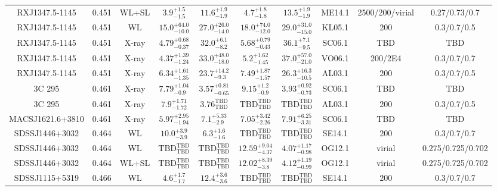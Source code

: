\begin{table}
\begin{tabular}{cccccccccc}
RXJ1347.5-1145 & 0.451 & WL+SL & ${3.9}^{+1.5}_{-1.5}$ & ${11.6}^{+1.9}_{-1.9}$ & ${4.7}^{+1.8}_{-1.8}$ & ${13.5}^{+1.9}_{-1.9}$ & ME14.1 & 2500/200/virial & 0.27/0.73/0.7 \\
RXJ1347.5-1145 & 0.451 & WL & ${15.0}^{+64.0}_{-10.0}$ & ${27.0}^{+26.0}_{-14.0}$ & ${18.0}^{+74.0}_{-12.0}$ & ${29.0}^{+31.0}_{-15.0}$ & KL05.1 & 200 & 0.3/0.7/0.5 \\
RXJ1347.5-1145 & 0.451 & X-ray & ${4.79}^{+0.68}_{-0.37}$ & ${32.0}^{+6.1}_{-8.2}$ & ${5.68}^{+0.79}_{-0.43}$ & ${36.1}^{+7.1}_{-9.5}$ & SC06.1 & TBD & TBD \\
RXJ1347.5-1145 & 0.451 & X-ray & ${4.37}^{+1.39}_{-1.24}$ & ${33.0}^{+48.0}_{-18.0}$ & ${5.2}^{+1.62}_{-1.45}$ & ${37.0}^{+57.0}_{-21.0}$ & VO06.1 & 200/2E4 & 0.3/0.7/0.7 \\
RXJ1347.5-1145 & 0.451 & X-ray & ${6.34}^{+1.61}_{-1.35}$ & ${23.7}^{+14.2}_{-9.3}$ & ${7.49}^{+1.87}_{-1.57}$ & ${26.3}^{+16.3}_{-10.5}$ & AL03.1 & 200 & 0.3/0.7/0.5 \\
3C 295 & 0.461 & X-ray & ${7.79}^{+1.04}_{-0.9}$ & ${3.57}^{+0.81}_{-0.65}$ & ${9.15}^{+1.2}_{-0.9}$ & ${3.93}^{+0.92}_{-0.73}$ & SC06.1 & TBD & TBD \\
3C 295 & 0.461 & X-ray & ${7.9}^{+1.71}_{-1.72}$ & ${3.76}^{\mathrm{TBD}}_{\mathrm{TBD}}$ & ${\mathrm{TBD}}^{\mathrm{TBD}}_{\mathrm{TBD}}$ & ${\mathrm{TBD}}^{\mathrm{TBD}}_{\mathrm{TBD}}$ & AL03.1 & 200 & 0.3/0.7/0.5 \\
MACSJ1621.6+3810 & 0.461 & X-ray & ${5.97}^{+2.95}_{-1.94}$ & ${7.1}^{+5.33}_{-2.9}$ & ${7.05}^{+3.42}_{-2.26}$ & ${7.91}^{+6.25}_{-3.31}$ & SC06.1 & TBD & TBD \\
SDSSJ1446+3032 & 0.464 & WL & ${10.0}^{+3.9}_{-3.9}$ & ${6.3}^{+1.6}_{-1.6}$ & ${\mathrm{TBD}}^{\mathrm{TBD}}_{\mathrm{TBD}}$ & ${\mathrm{TBD}}^{\mathrm{TBD}}_{\mathrm{TBD}}$ & SE14.1 & 200 & 0.3/0.7/0.7 \\
SDSSJ1446+3032 & 0.464 & WL & ${\mathrm{TBD}}^{\mathrm{TBD}}_{\mathrm{TBD}}$ & ${\mathrm{TBD}}^{\mathrm{TBD}}_{\mathrm{TBD}}$ & ${12.59}^{+9.04}_{-4.37}$ & ${4.07}^{+1.17}_{-0.98}$ & OG12.1 & virial & 0.275/0.725/0.702 \\
SDSSJ1446+3032 & 0.464 & WL+SL & ${\mathrm{TBD}}^{\mathrm{TBD}}_{\mathrm{TBD}}$ & ${\mathrm{TBD}}^{\mathrm{TBD}}_{\mathrm{TBD}}$ & ${12.02}^{+8.39}_{-3.8}$ & ${4.12}^{+1.19}_{-0.99}$ & OG12.1 & virial & 0.275/0.725/0.702 \\
SDSSJ1115+5319 & 0.466 & WL & ${4.6}^{+1.7}_{-1.7}$ & ${12.4}^{+3.6}_{-3.6}$ & ${\mathrm{TBD}}^{\mathrm{TBD}}_{\mathrm{TBD}}$ & ${\mathrm{TBD}}^{\mathrm{TBD}}_{\mathrm{TBD}}$ & SE14.1 & 200 & 0.3/0.7/0.7 \\

\end{tabular}
\end{table}
